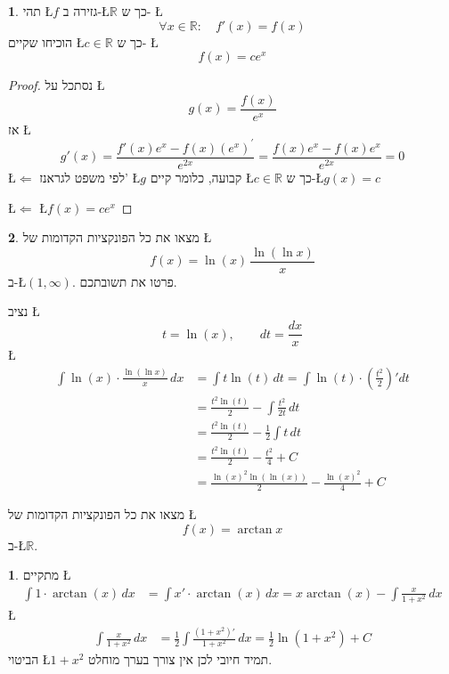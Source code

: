 \documentclass[english,hebrew]{article}
\theoremstyle{definition}
\newtheorem*{problem*}{\protect\problemname}
\theoremstyle{definition}
\newtheorem*{sol*}{\protect\solutionname}
\providecommand{\problemname}{בעיה}
\providecommand{\solutionname}{פתרון}
\begin{document}
\begin{problem*}
תהי \L{$f$} גזירה ב-\L{$\mathbb{R}$} כך ש- \L{%
\[
\forall x\in\mathbb{R}:\quad f'(x)=f(x)
\]
}%
הוכיחו שקיים \L{$c\in\mathbb{R}$} כך ש- \L{%
\[
f(x)=ce^{x}
\]
}%
\end{problem*}
\begin{proof}
נסתכל על \L{%
\[
g(x)=\frac{f(x)}{e^{x}}
\]
}%
אז \L{%
\[
g'(x)=\frac{f'(x)e^{x}-f(x)\left(e^{x}\right)^{'}}{e^{2x}}=\frac{f(x)e^{x}-f(x)e^{x}}{e^{2x}}=0
\]
}%
\L{$\Leftarrow$} לפי משפט לגראנז' \L{$g$} קבועה, כלומר קיים \L{$c\in\mathbb{R}$}
כך ש-\L{$g(x)=c$}

\L{$\Leftarrow$} \L{$f(x)=ce^{x}$}
\end{proof}
\begin{problem*}
מצאו את כל הפונקציות הקדומות של \L{%
\[
f(x)=\ln(x)\,\frac{\ln(\ln x)}{x}
\]
}%
ב-\L{$(1,\infty)$}. פרטו את תשובתכם.

נציב \L{%
\[
t=\ln(x),\qquad dt=\frac{dx}{x}
\]
}%
\L{%
\begin{align*}
\int\ln(x)\cdot\frac{\ln(\ln x)}{x}\,dx & =\int t\ln(t)\,dt=\int\ln(t)\cdot\left(\frac{t^{2}}{2}\right)'dt\\
 & =\frac{t^{2}\ln(t)}{2}-\int\frac{t^{2}}{2t}\,dt\\
 & =\frac{t^{2}\ln(t)}{2}-\frac{1}{2}\int t\,dt\\
 & =\frac{t^{2}\ln(t)}{2}-\frac{t^{2}}{4}+C\\
 & =\frac{\ln(x)^{2}\ln(\ln(x))}{2}-\frac{\ln(x)^{2}}{4}+C
\end{align*}
}%

מצאו את כל הפונקציות הקדומות של \L{%
\[
f(x)=\arctan x
\]
}%
ב-\L{$\mathbb{R}$}.
\end{problem*}
\begin{sol*}
מתקיים \L{%
\begin{align*}
\int1\cdot\arctan(x)\,dx & =\int x'\cdot\arctan(x)\,dx=x\arctan(x)-\int\frac{x}{1+x^{2}}\,dx
\end{align*}
}%
\L{%
\begin{align*}
\int\frac{x}{1+x^{2}}\,dx & =\frac{1}{2}\int\frac{\left(1+x^{2}\right)'}{1+x^{2}}\,dx=\frac{1}{2}\ln\left(1+x^{2}\right)+C
\end{align*}
}%
הביטוי \L{$1+x^{2}$} תמיד חיובי לכן אין צורך בערך מוחלט.
\end{sol*}
\end{document}
